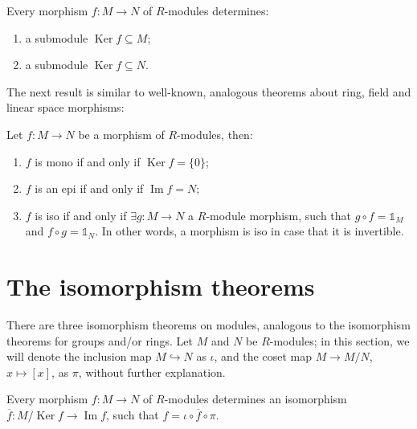 \documentclass[12pt, a4paper, titlepage]{report}
\DeclareMathOperator{\Ker}{Ker}
\DeclareMathOperator{\Ima}{Im}
\begin{document}
\begin{rem}
  Every morphism $f : M \rightarrow N$ of $R$-modules determines:

  \begin{enumerate}
  \item a submodule $\Ker f \subseteq M$;
  \item a submodule $\Ker f \subseteq N$.
  \end{enumerate}
\end{rem}

The next result is similar to well-known, analogous theorems about ring, field and linear space morphisms:

\begin{lem}
  \label{lem:morph}
  Let $f : M \rightarrow N$ be a morphism of $R$-modules, then:

  \begin{enumerate}
  \item $f$ is mono if and only if $\Ker f = \{0\}$;
  \item $f$ is an epi if and only if $\Ima f = N$;
  \item $f$ is iso if and only if $\exists g : M \rightarrow N$ a $R$-module morphism,
    such that $g \circ f = \mathds{1}_M$ and $f \circ g = \mathds{1}_N$. In other words,
    a morphism is iso in case that it is invertible.
  \end{enumerate}
\end{lem}

\section{The isomorphism theorems}
There are three isomorphism theorems on modules, analogous to the isomorphism theorems for groups and/or rings.
Let $M$ and $N$ be $R$-modules; in this section, we will denote the inclusion map $M \hookrightarrow N$
as $\iota$, and the coset map $M \to M/N$, $x \mapsto [x]$, as $\pi$, without further explanation. 

\begin{thm}
  \label{thm:fstiso}
  Every morphism $f : M \to N$ of $R$-modules determines an isomorphism $\overline{f} : M/\Ker f \to \Ima f$,
  such that $f = \iota \circ \overline{f} \circ \pi$.
\end{thm}
\end{document}
